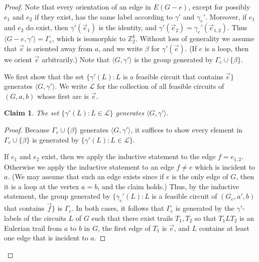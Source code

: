 \documentclass[10pt,a4paper]{amsart}
\newtheorem{claim}{Claim}
\begin{document}
\begin{proof}

    Note that every orientation of an edge in $E(G-e)$, except for possibly $e_1$ and $e_2$ if they exist, has the same label according to $\gamma'$ and $\gamma_e'$. Moreover, if $e_1$ and $e_2$ do exist, then $\gamma'(\vec{e}_1)$ is the identity, and $\gamma'(\vec{e}_2)=\gamma_e'(\vec{e}_{1,2})$. Thus $\langle G - e, \gamma'\rangle = \Gamma_e$, which is isomorphic to $\mathbb{Z}_2^k$. Without loss of generality we assume that $\vec{e}$ is oriented away from $a$, and we write $\beta$ for $\gamma'(\vec{e})$. (If $e$ is a loop, then we orient $\vec{e}$ arbitrarily.) Note that $\langle G, \gamma'\rangle$ is the group generated by $\Gamma_e \cup \{\beta\}$.

    We first show that the set $\{\gamma'(L) : L$ is a feasible circuit that contains $\vec{e}\}$ generates $\langle G, \gamma'\rangle$. We write $\mathcal{L}$ for the collection of all feasible circuits of $(G, a, b)$ whose first arc is $\vec{e}$. 

    \begin{claim}
    \label{clm:ecircuit}
        The set $\{\gamma'(L): L \in \mathcal{L}\}$ generates $\langle G, \gamma'\rangle$.
    \end{claim}
    \begin{proof}
        Because $\Gamma_e \cup \{\beta\}$ generates $\langle G, \gamma'\rangle$, it suffices to show every element in $\Gamma_e \cup \{\beta\}$ is generated by $\{\gamma'(L): L \in \mathcal{L}\}$.
    
        If $e_1$ and $e_2$ exist, then we apply the inductive statement to the edge $f = e_{1,2}$. Otherwise we apply the inductive statement to an edge $f\neq e$ which is incident to $a$. (We may assume that such an edge exists since if $e$ is the only edge of $G$, then it is a loop at the vertex $a=b$, and the claim holds.) Thus, by the inductive statement, the group generated by $\{\gamma_e'(L): L$ is a feasible circuit of $(G_e, a', b)$ that contains $\vec{f}\}$ is $\Gamma_e$. In both cases, it follows that $\Gamma_e$ is generated by the $\gamma'$-labels of the circuits $L$ of $G$ such that there exist trails $T_1, T_2$ so that $T_1 L T_2$ is an Eulerian trail from $a$ to $b$ in $G$, the first edge of $T_1$ is $\vec{e}$, and $L$ contains at least one edge that is incident to $a$. 


\end{proof}
\end{proof}
\end{document}
